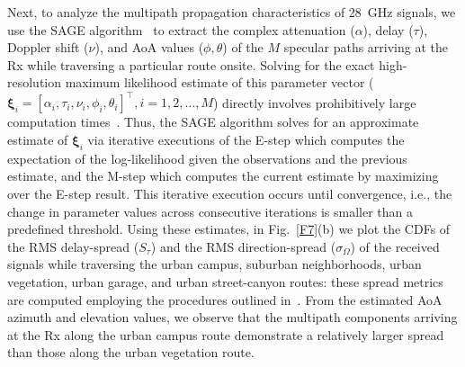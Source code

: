 \documentclass[12pt, draftcls, onecolumn]{IEEEtran}
\begin{document}
Next, to analyze the multipath propagation characteristics of \SI{28}{\giga\hertz} signals, we use the SAGE algorithm~\cite{SAGE} to extract the complex attenuation ($\alpha$), delay ($\tau$), Doppler shift ($\nu$), and AoA values ($\phi,\theta$) of the $M$ specular paths arriving at the Rx while traversing a particular route onsite. Solving for the exact high-resolution maximum likelihood estimate of this parameter vector ($\bm{\xi}_{i}{=}[\alpha_{i},\tau_{i},\nu_{i},\phi_{i},\theta_{i}]^{\intercal},i{=}1,2,{\dots},M$) directly involves prohibitively large computation times~\cite{SAGE}. Thus, the SAGE algorithm solves for an approximate estimate of $\bm{\xi}_{i}$ via iterative executions of the E-step which computes the expectation of the log-likelihood given the observations and the previous estimate, and the M-step which computes the current estimate by maximizing over the E-step result. This iterative execution occurs until convergence, i.e., the change in parameter values across consecutive iterations is smaller than a predefined threshold. Using these estimates, in Fig.~\ref{F7}(b) we plot the CDFs of the RMS delay-spread ($S_{\tau}$) and the RMS direction-spread ($\sigma_{\Omega}$) of the received signals while traversing the urban campus, suburban neighborhoods, urban vegetation, urban garage, and urban street-canyon routes: these spread metrics are computed employing the procedures outlined in~\cite{Indoor60G}. From the estimated AoA azimuth and elevation values, we observe that the multipath components arriving at the Rx along the urban campus route demonstrate a relatively larger spread than those along the urban vegetation route.
\end{document}
